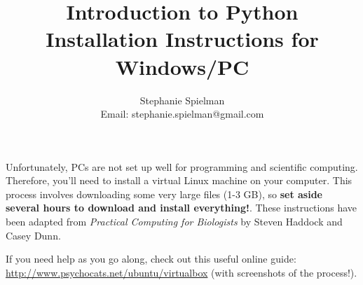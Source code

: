 \documentclass{article}
\begin{document}
\title{Introduction to Python \\ Installation Instructions for Windows/PC}
\author{Stephanie Spielman \\ \footnotesize{Email: stephanie.spielman@gmail.com}}
\date{}
\maketitle{}

Unfortunately, PCs are not set up well for programming and scientific computing. Therefore, you'll need to install a virtual Linux machine on your computer. This process involves downloading some very large files (1-3 GB), so \textbf{set aside several hours to download and install everything!}. These instructions have been adapted from \emph{Practical Computing for Biologists} by Steven Haddock and Casey Dunn.

If you need help as you go along, check out this useful online guide: \\ \href{http://www.psychocats.net/ubuntu/virtualbox}{http://www.psychocats.net/ubuntu/virtualbox} (with screenshots of the process!).
\end{document}
